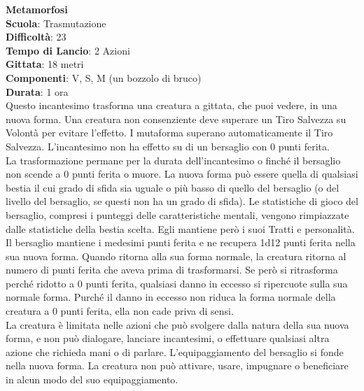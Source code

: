 \begin{multicols}{2}
\medskip\textbf{Metamorfosi}\\
\textbf{Scuola}: Trasmutazione\\
\textbf{Difficoltà}: 23\\
\textbf{Tempo di Lancio}: 2 Azioni\\
\textbf{Gittata}: 18 metri\\
\textbf{Componenti}: V, S, M (un bozzolo di bruco)\\
\textbf{Durata}: 1 ora \\
Questo incantesimo trasforma una creatura a gittata, che puoi vedere, in una nuova forma. Una creatura non consenziente deve superare un Tiro Salvezza su Volontà per evitare l'effetto. I mutaforma superano automaticamente il Tiro Salvezza. L'incantesimo non ha effetto su di un bersaglio con 0 punti ferita. \\
La trasformazione permane per la durata dell'incantesimo o finché il bersaglio non scende a 0 punti ferita o muore. La nuova forma può essere quella di qualsiasi bestia il cui grado di sfida sia uguale o più basso di quello del bersaglio (o del livello del bersaglio, se questi non ha un grado di sfida). Le statistiche di gioco del bersaglio, compresi i punteggi delle caratteristiche mentali, vengono rimpiazzate dalle statistiche della bestia scelta. Egli mantiene però i suoi Tratti e personalità.\\
Il bersaglio mantiene i medesimi punti ferita e ne recupera 1d12 punti ferita nella sua nuova forma. Quando ritorna alla sua forma normale, la creatura ritorna al numero di punti ferita che aveva prima di trasformarsi. Se però si ritrasforma perché ridotto a 0 punti ferita, qualsiasi danno in eccesso si ripercuote sulla sua normale forma. Purché il danno in eccesso non riduca la forma normale della creatura a 0 punti ferita, ella non cade priva di sensi.\\
La creatura è limitata nelle azioni che può svolgere dalla natura della sua nuova forma, e non può dialogare, lanciare incantesimi, o effettuare qualsiasi altra azione che richieda mani o di parlare. L'equipaggiamento del bersaglio si fonde nella nuova forma. La creatura non può attivare, usare, impugnare o beneficiare in alcun modo del suo equipaggiamento. 


\end{multicols}
